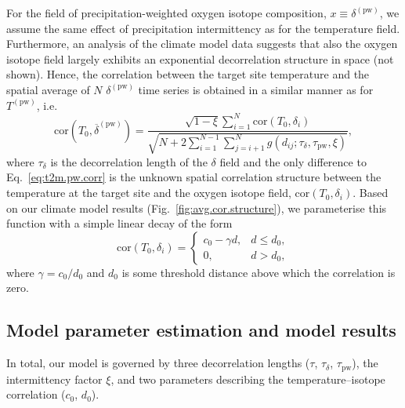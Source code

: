 \documentclass[cp, manuscript]{copernicus}
\begin{document}
For the field of precipitation-weighted oxygen isotope composition, $x \equiv
\delta^{\mathrm{(pw)}}$, we assume the same effect of precipitation
intermittency as for the temperature field. Furthermore, an analysis of the
climate model data suggests that also the oxygen isotope field largely exhibits
an exponential decorrelation structure in space (not shown). Hence, the
correlation between the target site temperature and the spatial average of $N$
$\delta^{\mathrm{(pw)}}$ time series is obtained in a similar manner as for
$T^{\mathrm{(pw)}}$, i.e.
%
\begin{equation}
\label{eq:oxy.pw.corr}
\mathrm{cor}\left(T_0,
  \overline{\delta}^{\mathrm{(pw)}}\right)=
\frac
{\sqrt{1-\xi}\sum_{i=1}^{N}\mathrm{cor}\left(T_0,\delta_i\right)}
{\sqrt{N + 2\sum_{i=1}^{N-1}\sum_{j=i+1}^{N}
  g(d_{ij}; \tau_{\delta}, \tau_{\mathrm{pw}}, \xi)}},
\end{equation}
%
where $\tau_{\delta}$ is the decorrelation length of the $\delta$ field and the
only difference to Eq.~\eqref{eq:t2m.pw.corr} is the unknown spatial correlation
structure between the temperature at the target site and the oxygen isotope
field, $\mathrm{cor}\left(T_0,\delta_i\right)$.  Based on our climate model
results (Fig.~\ref{fig:avg.cor.structure}), we parameterise this function with a
simple linear decay of the form
%
\begin{equation}
\label{eq:t2m.oxy.corr}
\mathrm{cor}\left(T_0,\delta_i\right)=
\begin{cases}
  c_0 - \gamma d, & d \le d_0,\\
  0, & d > d_0,
\end{cases}
\end{equation}
%
where $\gamma=c_0/d_0$ and $d_0$ is some threshold distance above which
the correlation is zero.

\subsection{Model parameter estimation and model results}
\label{app:concept.model.estimation}

In total, our model is governed by three decorrelation lengths ($\tau$,
$\tau_{\delta}$, $\tau_{\mathrm{pw}}$), the intermittency factor $\xi$, and
two parameters describing the temperature--isotope correlation ($c_0$, $d_0$).
\end{document}
